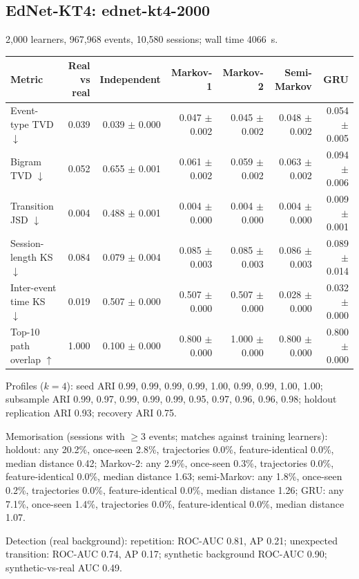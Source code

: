 \subsection*{EdNet-KT4: ednet-kt4-2000}
2{,}000 learners, 967{,}968 events, 10{,}580 sessions; wall time 4066~s.

\begin{tabular}{l r r r r r r }
\toprule
Metric & Real vs real & Independent & Markov-1 & Markov-2 & Semi-Markov & GRU \\
\midrule
Event-type TVD $\downarrow$ & 0.039 & 0.039 $\pm$ 0.000 & 0.047 $\pm$ 0.002 & 0.045 $\pm$ 0.002 & 0.048 $\pm$ 0.002 & 0.054 $\pm$ 0.005 \\
Bigram TVD $\downarrow$ & 0.052 & 0.655 $\pm$ 0.001 & 0.061 $\pm$ 0.002 & 0.059 $\pm$ 0.002 & 0.063 $\pm$ 0.002 & 0.094 $\pm$ 0.006 \\
Transition JSD $\downarrow$ & 0.004 & 0.488 $\pm$ 0.001 & 0.004 $\pm$ 0.000 & 0.004 $\pm$ 0.000 & 0.004 $\pm$ 0.000 & 0.009 $\pm$ 0.001 \\
Session-length KS $\downarrow$ & 0.084 & 0.079 $\pm$ 0.004 & 0.085 $\pm$ 0.003 & 0.085 $\pm$ 0.003 & 0.086 $\pm$ 0.003 & 0.089 $\pm$ 0.014 \\
Inter-event time KS $\downarrow$ & 0.019 & 0.507 $\pm$ 0.000 & 0.507 $\pm$ 0.000 & 0.507 $\pm$ 0.000 & 0.028 $\pm$ 0.000 & 0.032 $\pm$ 0.000 \\
Top-10 path overlap $\uparrow$ & 1.000 & 0.100 $\pm$ 0.000 & 0.800 $\pm$ 0.000 & 1.000 $\pm$ 0.000 & 0.800 $\pm$ 0.000 & 0.800 $\pm$ 0.000 \\
\bottomrule
\end{tabular}

Profiles ($k=4$): seed ARI 0.99, 0.99, 0.99, 0.99, 1.00, 0.99, 0.99, 1.00, 1.00; subsample ARI 0.99, 0.97, 0.99, 0.99, 0.99, 0.95, 0.97, 0.96, 0.96, 0.98; holdout replication ARI 0.93; recovery ARI 0.75.

Memorisation (sessions with $\geq$3 events; matches against training learners): holdout: any 20.2\%, once-seen 2.8\%, trajectories 0.0\%, feature-identical 0.0\%, median distance 0.42; Markov-2: any 2.9\%, once-seen 0.3\%, trajectories 0.0\%, feature-identical 0.0\%, median distance 1.63; semi-Markov: any 1.8\%, once-seen 0.2\%, trajectories 0.0\%, feature-identical 0.0\%, median distance 1.26; GRU: any 7.1\%, once-seen 1.4\%, trajectories 0.0\%, feature-identical 0.0\%, median distance 1.07.

Detection (real background): repetition: ROC-AUC 0.81, AP 0.21; unexpected transition: ROC-AUC 0.74, AP 0.17; synthetic background ROC-AUC 0.90; synthetic-vs-real AUC 0.49.

